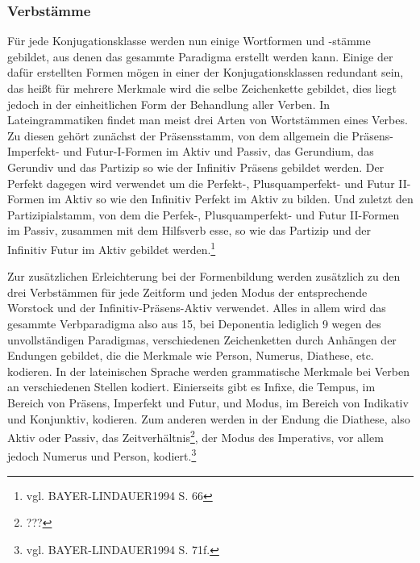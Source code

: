 \documentclass[12pt,abstract=on,titlepage,bibliography=totoc,ngerman,listof=totoc]{scrreprt}
\begin{document}
\subsubsection{Verbstämme}
Für jede Konjugationsklasse werden nun einige Wortformen und -stämme gebildet, aus denen das gesammte Paradigma erstellt werden kann. Einige der dafür erstellten Formen mögen in einer der Konjugationsklassen redundant sein, das heißt für mehrere Merkmale wird die selbe Zeichenkette gebildet, dies liegt jedoch in der einheitlichen Form der Behandlung aller Verben. In Lateingrammatiken findet man meist drei Arten von Wortstämmen eines Verbes. Zu diesen gehört zunächst der Präsensstamm, von dem allgemein die Präsens- Imperfekt- und Futur-I-Formen im Aktiv und Passiv, das Gerundium, das Gerundiv und das Partizip so wie der Infinitiv Präsens gebildet werden. Der Perfekt dagegen wird verwendet um die Perfekt-, Plusquamperfekt- und Futur II-Formen im Aktiv so wie den Infinitiv Perfekt im Aktiv zu bilden. Und zuletzt den Partizipialstamm, von dem die Perfek-, Plusquamperfekt- und Futur II-Formen im Passiv, zusammen mit dem Hilfsverb esse, so wie das Partizip und der Infinitiv Futur im Aktiv gebildet werden.\footnote{vgl. BAYER-LINDAUER1994 S. 66} \par
Zur zusätzlichen Erleichterung bei der Formenbildung werden zusätzlich zu den drei Verbstämmen für jede Zeitform und jeden Modus der entsprechende Worstock und der Infinitiv-Präsens-Aktiv verwendet. Alles in allem wird das gesammte Verbparadigma also aus 15, bei Deponentia lediglich 9 wegen des unvollständigen Paradigmas, verschiedenen Zeichenketten durch Anhängen der Endungen gebildet, die die Merkmale wie Person, Numerus, Diathese, etc. kodieren. In der lateinischen Sprache werden grammatische Merkmale bei Verben an verschiedenen Stellen kodiert. Einierseits gibt es Infixe, die Tempus, im Bereich von Präsens, Imperfekt und Futur, und Modus, im Bereich von Indikativ und Konjunktiv, kodieren. Zum anderen werden in der Endung die Diathese, also Aktiv oder Passiv, das Zeitverhältnis\footnote{???}, der Modus des Imperativs, vor allem jedoch Numerus und Person, kodiert.\footnote{vgl. BAYER-LINDAUER1994 S. 71f.} \par
\end{document}
